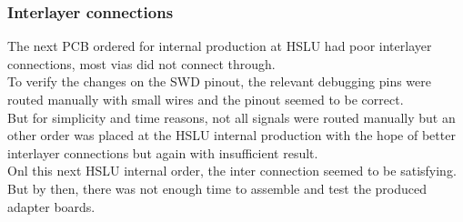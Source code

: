 \subsubsection{Interlayer connections}
The next PCB ordered for internal production at HSLU had poor interlayer connections, most vias did not connect through.\\
To verify the changes on the SWD pinout, the relevant debugging pins were routed manually with small wires and the pinout seemed to be correct.\\
But for simplicity and time reasons, not all signals were routed manually but an other order was placed at the HSLU internal production with the hope of better interlayer connections but again with insufficient result.\\
Onl this next HSLU internal order, the inter connection seemed to be satisfying.\\
But by then, there was not enough time to assemble and test the produced adapter boards.\\
%
%
%
%
%
%
%